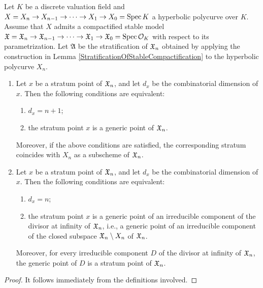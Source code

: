 \begin{lem}\label{StrataOfCodimensionZeroAndOne}
  Let $K$ be a discrete valuation field and $X = X_n \to X_{n - 1} \to \cdots \to X_1 \to X_0 = \mathrm{Spec} \, K$ a hyperbolic polycurve over $K$. Assume that $X$ admits a compactified stable model $\mathfrak{X} = \mathfrak{X}_n \to \mathfrak{X}_{n - 1} \to \cdots \to \mathfrak{X}_1 \to \mathfrak{X}_0 = \mathrm{Spec} \, \mathcal{O}_K$ with respect to its parametrization. Let $\mathfrak{A}$ be the stratification of $\mathfrak{X}_n$ obtained by applying the construction in Lemma \ref{StratificationOfStableCompactification} to the hyperbolic polycurve $X_n$.
  \begin{enumerate}
    \item Let $x$ be a stratum point of $\mathfrak{X}_n$, and let $d_x$ be the combinatorial dimension of $x$. Then the following conditions are equivalent:
      \begin{enumerate}
        \item $d_x = n + 1$;
        \item the stratum point $x$ is a generic point of $\mathfrak{X}_n$.
      \end{enumerate}
    Moreover, if the above conditions are satisfied, the corresponding stratum coincides with $X_n$ as a subscheme of $\mathfrak{X}_n$.
    \item Let $x$ be a stratum point of $\mathfrak{X}_n$, and let $d_x$ be the combinatorial dimension of $x$. Then the following conditions are equivalent:
      \begin{enumerate}
        \item $d_x = n$;
        \item the stratum point $x$ is a generic point of an irreducible component of the divisor at infinity of $\mathfrak{X}_n$, i.e., a generic point of an irreducible component of the closed subspace $\mathfrak{X}_n \setminus X_n$ of $\mathfrak{X}_n$.
      \end{enumerate}
    Moreover, for every irreducible component $D$ of the divisor at infinity of $\mathfrak{X}_n$, the generic point of $D$ is a stratum point of $\mathfrak{X}_n$.
  \end{enumerate}
\end{lem}
\begin{proof}
It follows immediately from the definitions involved.
\end{proof}

